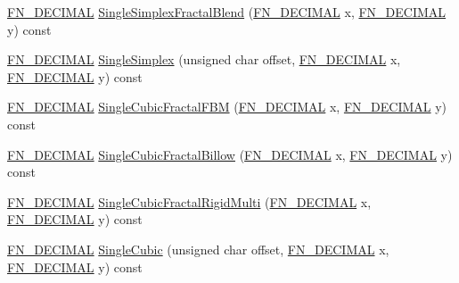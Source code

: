 \begin{DoxyCompactItemize}
\item 
\mbox{\hyperlink{_fast_noise_8h_a75a9ef6d2541c4921815b885bfd449c3}{F\+N\+\_\+\+D\+E\+C\+I\+M\+AL}} \mbox{\hyperlink{class_fast_noise_af076ea4b492ce8e166816c5842ce43da}{Single\+Simplex\+Fractal\+Blend}} (\mbox{\hyperlink{_fast_noise_8h_a75a9ef6d2541c4921815b885bfd449c3}{F\+N\+\_\+\+D\+E\+C\+I\+M\+AL}} x, \mbox{\hyperlink{_fast_noise_8h_a75a9ef6d2541c4921815b885bfd449c3}{F\+N\+\_\+\+D\+E\+C\+I\+M\+AL}} y) const
\item 
\mbox{\hyperlink{_fast_noise_8h_a75a9ef6d2541c4921815b885bfd449c3}{F\+N\+\_\+\+D\+E\+C\+I\+M\+AL}} \mbox{\hyperlink{class_fast_noise_a1aa539b6129719546bb4ed2847f1a11f}{Single\+Simplex}} (unsigned char offset, \mbox{\hyperlink{_fast_noise_8h_a75a9ef6d2541c4921815b885bfd449c3}{F\+N\+\_\+\+D\+E\+C\+I\+M\+AL}} x, \mbox{\hyperlink{_fast_noise_8h_a75a9ef6d2541c4921815b885bfd449c3}{F\+N\+\_\+\+D\+E\+C\+I\+M\+AL}} y) const
\item 
\mbox{\hyperlink{_fast_noise_8h_a75a9ef6d2541c4921815b885bfd449c3}{F\+N\+\_\+\+D\+E\+C\+I\+M\+AL}} \mbox{\hyperlink{class_fast_noise_a892cdc836d7704acfbf8c3680a1a2689}{Single\+Cubic\+Fractal\+F\+BM}} (\mbox{\hyperlink{_fast_noise_8h_a75a9ef6d2541c4921815b885bfd449c3}{F\+N\+\_\+\+D\+E\+C\+I\+M\+AL}} x, \mbox{\hyperlink{_fast_noise_8h_a75a9ef6d2541c4921815b885bfd449c3}{F\+N\+\_\+\+D\+E\+C\+I\+M\+AL}} y) const
\item 
\mbox{\hyperlink{_fast_noise_8h_a75a9ef6d2541c4921815b885bfd449c3}{F\+N\+\_\+\+D\+E\+C\+I\+M\+AL}} \mbox{\hyperlink{class_fast_noise_a679b755d2540f9c26cb1d978f92fbef2}{Single\+Cubic\+Fractal\+Billow}} (\mbox{\hyperlink{_fast_noise_8h_a75a9ef6d2541c4921815b885bfd449c3}{F\+N\+\_\+\+D\+E\+C\+I\+M\+AL}} x, \mbox{\hyperlink{_fast_noise_8h_a75a9ef6d2541c4921815b885bfd449c3}{F\+N\+\_\+\+D\+E\+C\+I\+M\+AL}} y) const
\item 
\mbox{\hyperlink{_fast_noise_8h_a75a9ef6d2541c4921815b885bfd449c3}{F\+N\+\_\+\+D\+E\+C\+I\+M\+AL}} \mbox{\hyperlink{class_fast_noise_ae8f66a142a0206d4907a5dab291f4b3d}{Single\+Cubic\+Fractal\+Rigid\+Multi}} (\mbox{\hyperlink{_fast_noise_8h_a75a9ef6d2541c4921815b885bfd449c3}{F\+N\+\_\+\+D\+E\+C\+I\+M\+AL}} x, \mbox{\hyperlink{_fast_noise_8h_a75a9ef6d2541c4921815b885bfd449c3}{F\+N\+\_\+\+D\+E\+C\+I\+M\+AL}} y) const
\item 
\mbox{\hyperlink{_fast_noise_8h_a75a9ef6d2541c4921815b885bfd449c3}{F\+N\+\_\+\+D\+E\+C\+I\+M\+AL}} \mbox{\hyperlink{class_fast_noise_a31ce14d8b90143da35b074d5fdeda85c}{Single\+Cubic}} (unsigned char offset, \mbox{\hyperlink{_fast_noise_8h_a75a9ef6d2541c4921815b885bfd449c3}{F\+N\+\_\+\+D\+E\+C\+I\+M\+AL}} x, \mbox{\hyperlink{_fast_noise_8h_a75a9ef6d2541c4921815b885bfd449c3}{F\+N\+\_\+\+D\+E\+C\+I\+M\+AL}} y) const

\end{DoxyCompactItemize}
